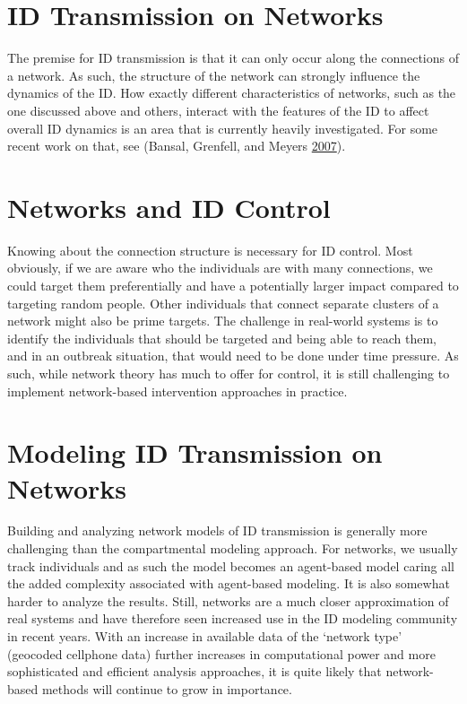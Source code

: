 \documentclass[]{book}
\theoremstyle{definition}
\theoremstyle{definition}
\theoremstyle{definition}
\theoremstyle{remark}
\begin{document}
\section{ID Transmission on Networks}\label{id-transmission-on-networks}

The premise for ID transmission is that it can only occur along the
connections of a network. As such, the structure of the network can
strongly influence the dynamics of the ID. How exactly different
characteristics of networks, such as the one discussed above and others,
interact with the features of the ID to affect overall ID dynamics is an
area that is currently heavily investigated. For some recent work on
that, see (Bansal, Grenfell, and Meyers
\protect\hyperlink{ref-bansal07}{2007}).

\section{Networks and ID Control}\label{networks-and-id-control}

Knowing about the connection structure is necessary for ID control. Most
obviously, if we are aware who the individuals are with many
connections, we could target them preferentially and have a potentially
larger impact compared to targeting random people. Other individuals
that connect separate clusters of a network might also be prime targets.
The challenge in real-world systems is to identify the individuals that
should be targeted and being able to reach them, and in an outbreak
situation, that would need to be done under time pressure. As such,
while network theory has much to offer for control, it is still
challenging to implement network-based intervention approaches in
practice.

\section{Modeling ID Transmission on
Networks}\label{modeling-id-transmission-on-networks}

Building and analyzing network models of ID transmission is generally
more challenging than the compartmental modeling approach. For networks,
we usually track individuals and as such the model becomes an
agent-based model caring all the added complexity associated with
agent-based modeling. It is also somewhat harder to analyze the results.
Still, networks are a much closer approximation of real systems and have
therefore seen increased use in the ID modeling community in recent
years. With an increase in available data of the `network type'
(geocoded cellphone data) further increases in computational power and
more sophisticated and efficient analysis approaches, it is quite likely
that network-based methods will continue to grow in importance.
\end{document}
